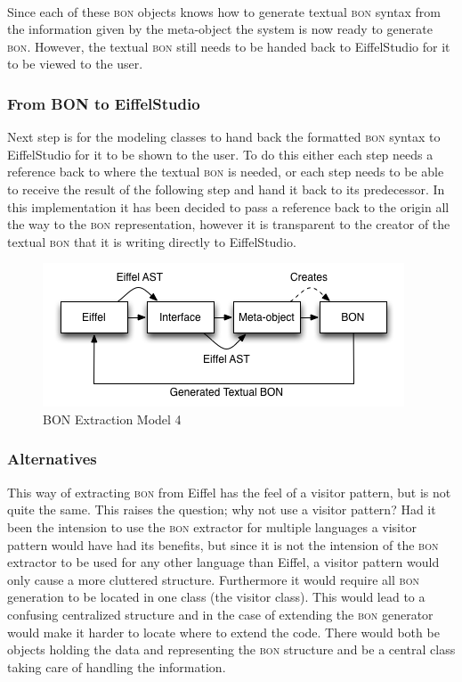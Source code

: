 \paragraph{}
Since each of these \textsc{bon} objects knows how to generate textual \textsc{bon} syntax from the information given by the meta-object the system is now ready to generate \textsc{bon}. However, the textual \textsc{bon} still needs to be handed back to EiffelStudio for it to be viewed to the user.

\subsubsection{From BON to EiffelStudio}
Next step is for the modeling classes to hand back the formatted \textsc{bon} syntax to EiffelStudio for it to be shown to the user. To do this either each step needs a reference back to where the textual \textsc{bon} is needed, or each step needs to be able to receive the result of the following step and hand it back to its predecessor. In this implementation it has been decided to pass a reference back to the origin all the way to the \textsc{bon} representation, however it is transparent to the creator of the textual \textsc{bon} that it is writing directly to EiffelStudio.

\begin{figure}[H]
\centering
\includegraphics[scale=0.8]{images/BON-extraction-model-4.png}
\caption{BON Extraction Model 4}
\label{fig:bon_extraction_4}
\end{figure}

\subsubsection{Alternatives}
This way of extracting \textsc{bon} from Eiffel has the feel of a visitor pattern, but is not quite the same. This raises the question; why not use a visitor pattern? Had it been the intension to use the \textsc{bon} extractor for multiple languages a visitor pattern would have had its benefits, but since it is not the intension of the \textsc{bon} extractor to be used for any other language than Eiffel, a visitor pattern would only cause a more cluttered structure. Furthermore it would require all \textsc{bon} generation to be located in one class (the visitor class). This would lead to a confusing centralized structure and in the case of extending the \textsc{bon} generator would make it harder to locate where to extend the code. There would both be objects holding the data and representing the \textsc{bon} structure and be a central class taking care of handling the information.
